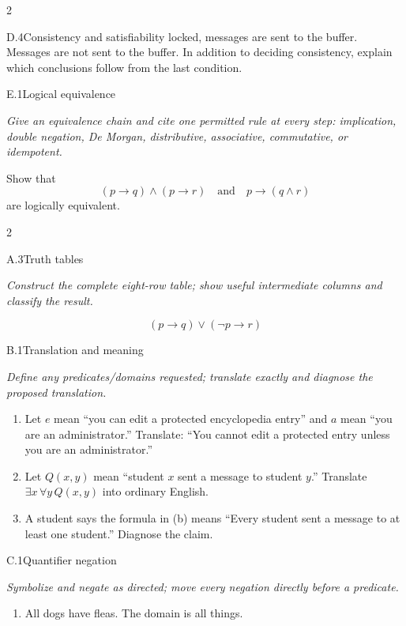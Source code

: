 \documentclass[9pt]{extarticle}
\begin{document}
\begin{multicols}{2}
\begin{CoreProblem}{D.4}{Consistency and satisfiability}
locked, messages are sent to the buffer. Messages are not sent to the buffer.
In addition to deciding consistency, explain which conclusions follow from the
last condition.
\end{CoreProblem}
\begin{CoreProblem}{E.1}{Logical equivalence}
{\scriptsize\textit{Give an equivalence chain and cite one permitted rule at every step: implication, double negation, De Morgan, distributive, associative, commutative, or idempotent.}\par}
Show that
\[
  (p\to q)\land(p\to r)
  \quad\text{and}\quad
  p\to(q\land r)
\]
are logically equivalent.
\end{CoreProblem}
\end{multicols}
\CoreWorkArea
\FormBreak
{}
\begin{multicols}{2}
\begin{CoreProblem}{A.3}{Truth tables}
{\scriptsize\textit{Construct the complete eight-row table; show useful intermediate columns and classify the result.}\par}
\[
  (p\to q)\lor(\neg p\to r)
\]
\end{CoreProblem}
\begin{CoreProblem}{B.1}{Translation and meaning}
{\scriptsize\textit{Define any predicates/domains requested; translate exactly and diagnose the proposed translation.}\par}
\begin{enumerate}[label=(\alph*)]
  \item Let $e$ mean ``you can edit a protected encyclopedia entry'' and $a$
        mean ``you are an administrator.'' Translate: ``You cannot edit a
        protected entry unless you are an administrator.''
  \item Let $Q(x,y)$ mean ``student $x$ sent a message to student $y$.''
        Translate $\exists x\,\forall y\,Q(x,y)$ into ordinary English.
  \item A student says the formula in (b) means ``Every student sent a message
        to at least one student.'' Diagnose the claim.
\end{enumerate}
\end{CoreProblem}
\begin{CoreProblem}{C.1}{Quantifier negation}
{\scriptsize\textit{Symbolize and negate as directed; move every negation directly before a predicate.}\par}
\begin{enumerate}[label=(\alph*)]
  \item All dogs have fleas. The domain is all things.

\end{enumerate}
\end{CoreProblem}
\end{multicols}
\end{document}
